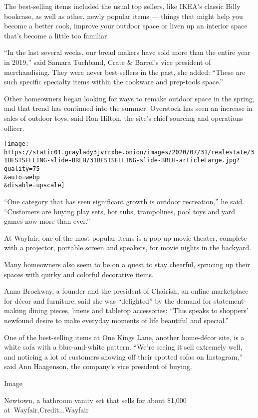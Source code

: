 The best-selling items included the usual top sellers, like IKEA's
classic Billy bookcase, as well as other, newly popular items --- things
that might help you become a better cook, improve your outdoor space or
liven up an interior space that's become a little too familiar.

``In the last several weeks, our bread makers have sold more than the
entire year in 2019,'' said Samara Tuchband, Crate \& Barrel's vice
president of merchandising. They were never best-sellers in the past,
she added: ``These are such specific specialty items within the cookware
and prep-tools space.''

Other homeowners began looking for ways to remake outdoor space in the
spring, and that trend has continued into the summer. Overstock has seen
an increase in sales of outdoor toys, said Ron Hilton, the site's chief
sourcing and operations officer.

\texttt{[image: https://static01.graylady3jvrrxbe.onion/images/2020/07/31/realestate/31BESTSELLING-slide-BRLH/31BESTSELLING-slide-BRLH-articleLarge.jpg?quality=75\\\&auto=webp\\\&disable=upscale]}

``One category that has seen significant growth is outdoor recreation,''
he said. ``Customers are buying play sets, hot tubs, trampolines, pool
toys and yard games now more than ever.''

At Wayfair, one of the most popular items is a pop-up movie theater,
complete with a projector, portable screen and speakers, for movie
nights in the backyard.

Many homeowners also seem to be on a quest to stay cheerful, sprucing up
their spaces with quirky and colorful decorative items.

Anna Brockway, a founder and the president of Chairish, an online
marketplace for décor and furniture, said she was ``delighted'' by the
demand for statement-making dining pieces, linens and tabletop
accessories: ``This speaks to shoppers' newfound desire to make everyday
moments of life beautiful and special.''

One of the best-selling items at One Kings Lane, another home-décor
site, is a white sofa with a blue-and-white pattern. ``We're seeing it
sell extremely well, and noticing a lot of customers showing off their
spotted sofas on Instagram,'' said Ann Haagenson, the company's vice
president of buying.

Image

Newtown, a bathroom vanity set that sells for about \$1,000
at~Wayfair.Credit...Wayfair

